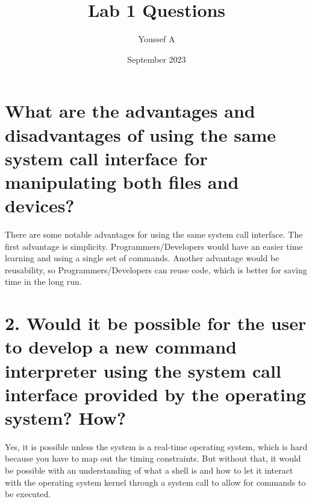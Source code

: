 \documentclass{article}
\title{Lab 1 Questions}
\author{Youssef A}
\date{September 2023}
\begin{document}
\maketitle
\section{ What are the advantages and disadvantages of using the same system call interface for manipulating both files and devices?}

There are some notable advantages for using the same system call interface. The first advantage is simplicity. Programmers/Developers would have an easier time learning and using a single set of commands. Another advantage would be reusability, so Programmers/Developers can reuse code, which is better for saving time in the long run.

\section{2. Would it be possible for the user to develop a new command interpreter using the system call interface provided by the operating system? How?}

Yes, it is possible unless the system is a real-time operating system, which is hard because you have to map out the timing constraints. But without that, it would be possible with an understanding of what a shell is and how to let it interact with the operating system kernel through a system call to allow for commands to be executed.
\end{document}
